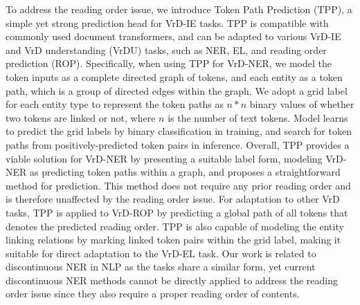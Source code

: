 \documentclass[11pt]{article}
\begin{document}
To address the reading order issue, we introduce Token Path Prediction (TPP), a simple yet strong prediction head for VrD-IE tasks. TPP is compatible with commonly used document transformers, and can be adapted to various VrD-IE and VrD understanding (VrDU) tasks, such as NER, EL, and reading order prediction (ROP). 
Specifically, when using TPP for VrD-NER, we model the token inputs as a complete directed graph of tokens, and each entity as a token path, which is a group of directed edges within the graph. We adopt a grid label for each entity type to represent the token paths as $n*n$ binary values of whether two tokens are linked or not, where $n$ is the number of text tokens. Model learns to predict the grid labels by binary classification in training, and search for token paths from positively-predicted token pairs in inference.
Overall, TPP provides a viable solution for VrD-NER by presenting a suitable label form, modeling VrD-NER as predicting token paths within a graph, and proposes a straightforward method for prediction.
This method does not require any prior reading order and is therefore unaffected by the reading order issue. 
For adaptation to other VrD tasks, TPP is applied to VrD-ROP by predicting a global path of all tokens that denotes the predicted reading order. 
TPP is also capable of modeling the entity linking relations by marking linked token pairs within the grid label, making it suitable for direct adaptation to the VrD-EL task.
Our work is related to discontinuous NER in NLP as the tasks share a similar form, yet current discontinuous NER methods cannot be directly applied to address the reading order issue since they also require a proper reading order of contents.
\end{document}
